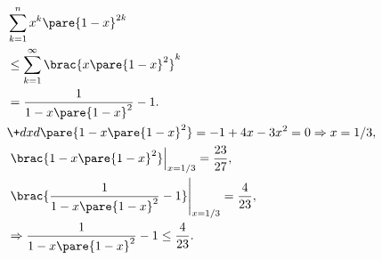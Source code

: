 \documentclass[hidelinks]{ctexart}
\begin{document}
\begin{align*}
    & \sum_{k=1}^n x^k \pare{1-x}^{2k} \\
    & \le \sum_{k=1}^\infty \brac{x\pare{1-x}^2}^k \\
    & = \frac{1}{1-x\pare{1-x}^2} - 1.\\
    & \+dxd{} \pare{1-x\pare{1-x}^2} = -1+4x-3x^2 = 0 \Rightarrow x=1/3,\\
    & \left.\brac{ 1-x\pare{1-x}^2 }\right\vert_{x=1/3} = \frac{23}{27}, \\
    & \left.\brac{ \frac{1}{1-x\pare{1-x}^2} - 1 }\right\vert_{x=1/3} = \frac{4}{23}, \\
    & \Rightarrow \frac{1}{1-x\pare{1-x}^2} - 1 \le \frac{4}{23}.
\end{align*}
\end{document}
